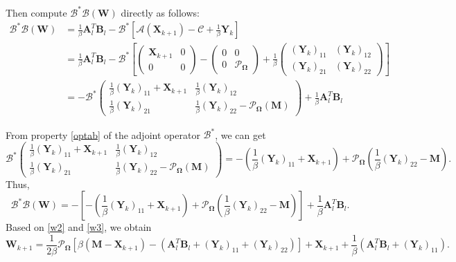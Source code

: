 \documentclass[fontset=windows]{article}
\begin{document}
{Then compute $	\mathcal{B}^*\mathcal{B}(\mathbf W)$ directly as follows:
\begin{align*}
    \mathcal{B}^*\mathcal{B}(\mathbf W) &=  \frac{1}{\beta}\mathbf A_l^T\mathbf B_l - \mathcal{B}^*\left[ \mathcal{A} (\mathbf X_{k+1} ) - \mathcal{C} +\frac{1}{\beta} \mathbf Y_k \right] \\
    & = \frac{1}{\beta}\mathbf A_l^T\mathbf B_l - \mathcal{B}^*\left[\begin{pmatrix}
        \mathbf X_{k+1} & 0 \\
        0 & 0
    \end{pmatrix} - 
    \begin{pmatrix}
        0 & 0 \\
        0 & \mathcal{P}_{\mathbf\Omega}
    \end{pmatrix} + \frac{1}{\beta} 
    \begin{pmatrix}
        (\mathbf Y_k)_{11} & (\mathbf Y_k)_{12} \\
        (\mathbf Y_k)_{21} & (\mathbf Y_k)_{22}
    \end{pmatrix}\right] \\
    & = -\mathcal{B}^*\begin{pmatrix}
        \frac{1}{\beta} (\mathbf Y_k)_{11} + \mathbf X_{k+1} & \frac{1}{\beta} (\mathbf Y_k)_{12} \\
        \frac{1}{\beta} (\mathbf Y_k)_{21} & \frac{1}{\beta} (\mathbf Y_k)_{22} - \mathcal{P}_{\mathbf\Omega}(\mathbf M)
    \end{pmatrix} + \frac{1}{\beta}\mathbf A_l^T\mathbf B_l
\end{align*}

From property \eqref{optab} of the adjoint operator $\mathcal{B}^*$, we can get 
\begin{equation*}
    \mathcal{B}^* \begin{pmatrix}
                \frac{1}{\beta} (\mathbf Y_k)_{11} + \mathbf X_{k+1} & \frac{1}{\beta} (\mathbf Y_k)_{12} \\
        \frac{1}{\beta} (\mathbf Y_k)_{21} & \frac{1}{\beta} (\mathbf Y_k)_{22} - \mathcal{P}_{\mathbf\Omega}(\mathbf M)
    \end{pmatrix} = -\left(\frac{1}{\beta}(\mathbf Y_k)_{11} + \mathbf X_{k+1} \right) + \mathcal{P}_{\mathbf\Omega}(\frac{1}{\beta} (\mathbf Y_k)_{22}-\mathbf M).
\end{equation*}
Thus,
\begin{equation}
    \mathcal{B}^*\mathcal{B}(\mathbf W) = - \left[-\left(\frac{1}{\beta}(\mathbf Y_k)_{11} + \mathbf X_{k+1} \right) + \mathcal{P}_{\mathbf\Omega}(\frac{1}{\beta} (\mathbf Y_k)_{22}-\mathbf M) \right] + \frac{1}{\beta}\mathbf A_l^T\mathbf B_l.\label{w3}
\end{equation}
Based on \eqref{w2} and \eqref{w3}, we obtain
\begin{equation}
    \mathbf W_{k+1} = \frac{1}{2\beta} \mathcal{P}_{\mathbf\Omega} [\beta(\mathbf M-\mathbf X_{k+1}) - (\mathbf A_l^T\mathbf B_l + (\mathbf Y_k)_{11}+ (\mathbf Y_k)_{22})] + \mathbf X_{k+1} +  \frac{1}{\beta}(\mathbf A_l^T\mathbf B_l + (\mathbf Y_k)_{11}).
\end{equation}

}
\end{document}

